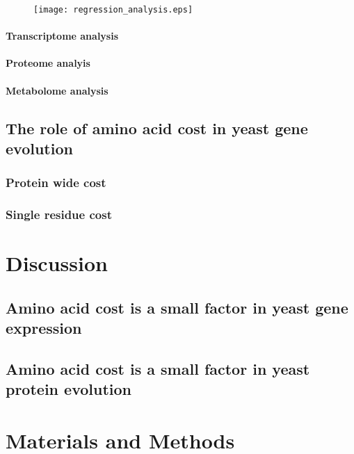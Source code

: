 \begin{figure}
\centering
\texttt{[image: regression\_analysis.eps]}
\caption[Multivariation regression of transcriptomic, proteineomic and metabolimic data.]{}
\label{figure:regression_analysis}
\end{figure}

\paragraph{Transcriptome analysis}

\paragraph{Proteome analyis}

\paragraph{Metabolome analysis}

\subsection{The role of amino acid cost in yeast gene evolution}

\subsubsection{Protein wide cost}

\subsubsection{Single residue cost}

\section{Discussion}

\subsection{Amino acid cost is a small factor in yeast gene expression}

\subsection{Amino acid cost is a small factor in yeast protein evolution}

\section{Materials and Methods}

